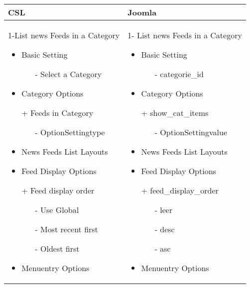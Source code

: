\begin{minipage}{0.7\textwidth}
\begin{tabular}{|p{} | p{}|}
\hline
\textbf{CSL} & \textbf{Joomla} \\ 
\hline
 1-List news Feeds in a Category
   \begin{itemize}
     \item Basic  Setting 
    		\begin{enumerate}
    			\item[-] Select a Category 
    		\end{enumerate}
    	\item Category Options
    	\item[+] Feeds in Category 
    		    	  \begin{enumerate}
    		    			 \item[-] OptionSettingtype
    		    	\end{enumerate}
    \item News Feeds List Layouts
    \item Feed Display Options
    \item[+] Feed display order
           	\begin{enumerate}
           		\item[-] Use Global
           		\item[-] Most recent first
           		\item[-] Oldest first
           	\end{enumerate}	
 	\item Menuentry Options
  \end{itemize}
 & 
1- List news Feeds in a Category
  \begin{itemize}
    \item Basic  Setting 
   		\begin{enumerate}
   			\item[-] categorie\_id
   		\end{enumerate}
   	\item Category Options
   	\item[+] show\_cat\_items
		\begin{enumerate}
 			 \item[-] OptionSettingvalue
	    	\end{enumerate}
   	\item News Feeds List Layouts
   	\item Feed Display Options
   	\item[+] feed\_display\_order
   	   	\begin{enumerate}
   	   		\item[-] leer
   	   		\item[-] desc
   	   		\item[-] asc
   	   	\end{enumerate}	
	\item Menuentry Options
 \end{itemize}
\\
\hline
\end{tabular}
\end{minipage}

